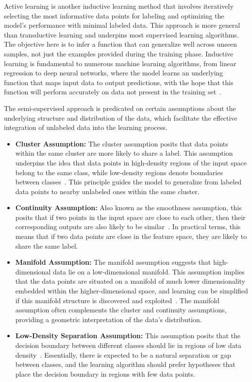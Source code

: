 Active learning is another inductive learning method that involves iteratively selecting the most informative data points for labeling and optimizing the model's performance with minimal labeled data.
This approach is more general than transductive learning and underpins most supervised learning algorithms.
The objective here is to infer a function that can generalize well across unseen samples, not just the examples provided during the training phase.
Inductive learning is fundamental to numerous machine learning algorithms, from linear regression to deep neural networks, where the model learns an underlying function that maps input data to output predictions, with the hope that this function will perform accurately on data not present in the training set~\cite{mitchell1997machine}.

The semi-supervised approach is predicated on certain assumptions about the underlying structure and distribution of the data, which facilitate the effective integration of unlabeled data into the learning process.
\begin{itemize}
	\item \textbf{Cluster Assumption:} {The cluster assumption posits that data points within the same cluster are more likely to share a label. This assumption underpins the idea that data points in high-density regions of the input space belong to the same class, while low-density regions denote boundaries between classes~\cite{chapelle2009semi}. This principle guides the model to generalize from labeled data points to nearby unlabeled ones within the same cluster.}
	\item \textbf{Continuity Assumption:} {Also known as the smoothness assumption, this posits that if two points in the input space are close to each other, then their corresponding outputs are also likely to be similar~\cite{zhou2004learning}. In practical terms, this means that if two data points are close in the feature space, they are likely to share the same label.}
	\item \textbf{Manifold Assumption:} {The manifold assumption suggests that high-dimensional data lie on a low-dimensional manifold. This assumption implies that the data points are situated on a manifold of much lower dimensionality embedded within the higher-dimensional space, and learning can be simplified if this manifold structure is discovered and exploited~\cite{belkin2006manifold}. The manifold assumption often complements the cluster and continuity assumptions, providing a geometric interpretation of the data's distribution.}
	\item \textbf{Low-Density Separation Assumption:} {This assumption posits that the decision boundary between different classes should lie in regions of low data density~\cite{chapelle2009semi}. Essentially, there is expected to be a natural separation or gap between classes, and the learning algorithm should prefer hypotheses that place the decision boundary in regions with few data points.}
\end{itemize}

